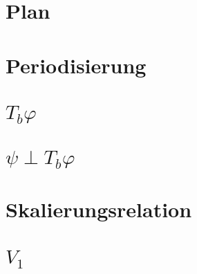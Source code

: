 %
%
%


\section{Plan}


\section{Periodisierung}
%

\section{$T_b\varphi$}
%

\section{$\psi\perp T_b\varphi$}
%

\section{Skalierungsrelation}


\section{$V_1$}



